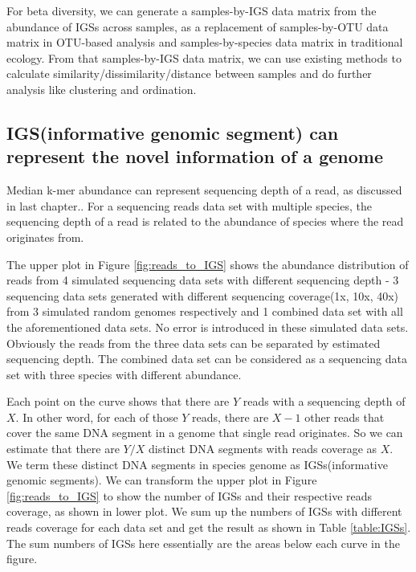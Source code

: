 For beta diversity, we can generate a samples-by-IGS data matrix from the
abundance of IGSs across samples, as a replacement of samples-by-OTU data 
matrix in OTU-based analysis and samples-by-species data matrix in traditional 
ecology. From that samples-by-IGS data matrix, we can use existing methods to 
calculate similarity/dissimilarity/distance between samples and do further 
analysis like clustering and ordination. 


\subsection{IGS(informative genomic segment) can represent the novel 
information of a genome}

Median k-mer abundance can represent sequencing depth of a read, as discussed
in last chapter.\cite{Brown2012}.
 For a sequencing reads data set with multiple species, the sequencing depth of
 a read is related to the abundance of species where the read originates from. 

The upper plot in Figure \ref{fig:reads_to_IGS} shows the abundance distribution of reads 
from 4 simulated sequencing data sets with different sequencing depth - 3 
sequencing data sets generated with different sequencing coverage(1x, 10x, 40x)
 from 3 simulated random genomes respectively and 1 combined data set with all 
the aforementioned data sets. No error is introduced in these simulated 
data sets. Obviously the reads from the three data sets can be separated by 
estimated sequencing depth. The combined data set can be considered as a 
sequencing data set with three species with different abundance.

Each point on the curve shows that there are $Y$ reads with a sequencing depth of
 $X$. In other word, for each of those $Y$ reads, there are $X-1$ other reads that 
cover the same DNA segment in a genome that single read originates. So we can 
estimate that there are $Y/X$ distinct DNA segments with reads coverage as $X$. 
We term these distinct DNA segments in species genome as 
IGSs(informative genomic segments). We can transform the upper plot in 
Figure \ref{fig:reads_to_IGS} to show the number of IGSs and their respective 
reads coverage, as 
shown in lower plot. We sum up the numbers of IGSs with 
different reads coverage for each data set and get the result as shown in 
Table \ref{table:IGSs}. The sum numbers of IGSs here essentially are the areas below each curve 
in the figure.

